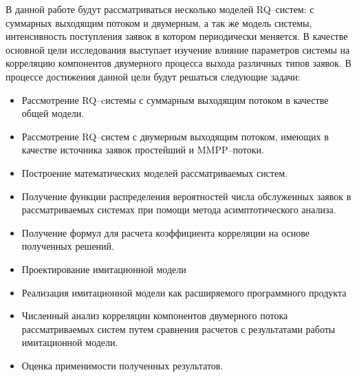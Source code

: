 В данной работе будут рассматриваться несколько моделей RQ--систем: с суммарных выходящим потоком и двумерным, а так же модель системы, интенсивность поступления заявок в котором периодически меняется. В качестве основной цели исследования выступает изучение влияние параметров системы на корреляцию компонентов двумерного процесса выхода различных типов заявок. В процессе достижения данной цели будут решаться следующие задачи:
\begin{itemize}
	\item Рассмотрение RQ--cистемы с суммарным выходящим потоком в качестве общей модели.
	\item Рассмотрение RQ--систем с двумерным выходящим потоком, имеющих в качестве источника заявок простейший и MMPP--потоки. 
	\item Построение математических моделей рассматриваемых систем.
	\item Получение функции распределения вероятностей числа обслуженных заявок в рассматриваемых системах при помощи метода асимптотического анализа.
	\item Получение формул для расчета коэффициента корреляции на основе полученных решений.
	\item Проектирование имитационной модели
	\item Реализация имитационной модели как расширяемого программного продукта
	\item Численный анализ корреляции компонентов двумерного потока рассматриваемых систем путем сравнения расчетов с результатами работы имитационной модели.
	\item Оценка применимости полученных результатов.
\end{itemize}


 \clearpage
